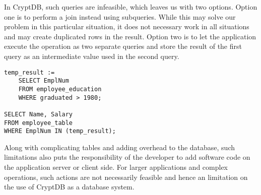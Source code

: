 In CryptDB, such queries are infeasible, which leaves us with two options. Option one is to perform a join instead using subqueries. While this may solve our problem in this particular situation, it does not necessary work in all situations and may create duplicated rows in the result. Option two is to let the application execute the operation as two separate queries and store the result of the first query as an intermediate value used in the second query.

\begin{verbatim}
temp_result :=
    SELECT EmplNum
    FROM employee_education
    WHERE graduated > 1980;

SELECT Name, Salary
FROM employee_table 
WHERE EmplNum IN (temp_result);
\end{verbatim}


Along with complicating tables and adding overhead to the database, such limitations also puts the responsibility of the developer to add software code on the application server or client side. For larger applications and complex operations, such actions are not necessarily feasible and hence an limitation on the use of CryptDB as a database system.\\